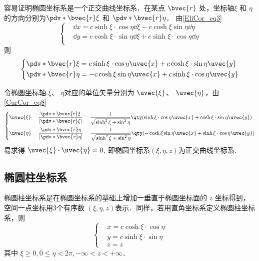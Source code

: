 容易证明椭圆坐标系是一个正交曲线坐标系．在某点 $\bvec{r}$ 处，坐标轴$\xi$ 和 $\eta$ 的方向分别为$\pdv*{\bvec{r}}{\xi}$ 和 $\pdv*{\bvec{r}}{\eta}$．
由\autoref{EliCor_eq3} 
\begin{equation}
\left\{
    \begin{aligned}
    &\dd x=c\sinh\xi\cdot\cos\eta\dd\xi-c\cosh\xi\sin\eta\dd\eta\\
    &\dd y=c\cosh\xi\cdot\sin\eta\dd\xi+c\sinh\xi\cdot\cos\eta\dd\eta\\
    \end{aligned}\right.
\end{equation}
则
\begin{equation}
\left\{
    \begin{aligned}
&\pdv*{\bvec{r}}{\xi}=c\sinh\xi\cdot\cos\eta\uvec{x}+c\cosh\xi\cdot\sin\eta\uvec{y}\\
&\pdv*{\bvec{r}}{\eta}=-c\cosh\xi\sin\eta\uvec{x}+c\sinh\xi\cdot\cos\eta\uvec{y}\\
    \end{aligned}\right.
\end{equation}

令椭圆坐标轴 $\xi$、 $\eta$对应的单位矢量分别为 $\uvec{\xi}$、 $\uvec{\eta}$，由\autoref{CurCor_eq8}~
\begin{equation}
\left\{
    \begin{aligned}
    &\uvec{\xi}=\frac{\pdv*{\bvec{r}}{\xi}}{|\pdv*{\bvec{r}}{\xi}|}=\frac{1}{\sqrt{\sinh^2\xi+\sin^2\eta}}\qty(\sinh\xi\cdot\cos\eta\uvec{x}+\cosh\xi\cdot\sin\eta\uvec{y})\\
    &\uvec{\eta }=\frac{\pdv*{\bvec{r}}{\eta}}{|\pdv*{\bvec{r}}{\eta}|}=\frac{1}{\sqrt{\sinh^2\xi+\sin^2\eta}}\qty(-\cosh\xi\sin\eta\uvec{x}+\sinh\xi\cdot\cos\eta\uvec{y})\\
    \end{aligned}\right.
\end{equation}
易求得 $\uvec{\xi}\cdot\uvec{\eta}=0$, 即椭圆坐标系$(\xi,\eta,z)$为正交曲线坐标系.
\subsection{椭圆柱坐标系}
椭圆柱坐标系是在椭圆坐标系的基础上增加一垂直于椭圆坐标面的 $z$ 坐标得到，空间一点坐标用3个有序数 $(\xi,\eta,z)$表示．同样，若用直角坐标系定义椭圆柱坐标系，则
\begin{equation}\label{EliCor_eq1}
\left\{\begin{aligned}
&x=c\cosh\xi\cdot\cos\eta\\
&y=c\sinh\xi\cdot\sin\eta\\
&z=z
\end{aligned}\right.
\end{equation}
其中 $\xi\geq0,0\leq\eta<2\pi,-\infty<z<+\infty$．

